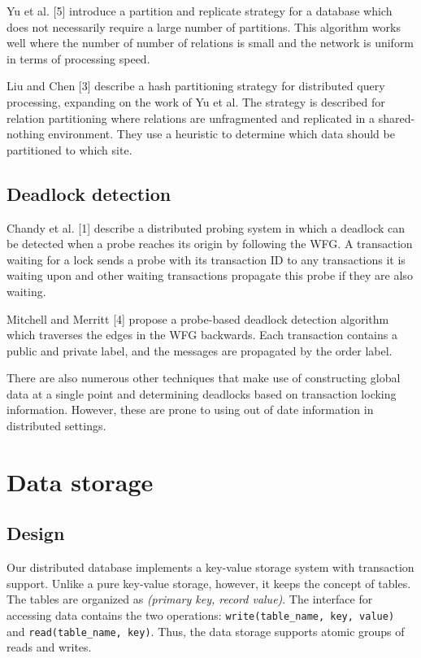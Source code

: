 \documentclass[a4paper, 10pt, notitlepage]{article}
\begin{document}
Yu et al. [5] introduce a partition and replicate strategy for a database which does not necessarily require a large number of partitions. This algorithm works well where the number of number of relations is small and the network is uniform in terms of processing speed.

Liu and Chen [3] describe a hash partitioning strategy for distributed query processing, expanding on the work of Yu et al. The strategy is described for relation partitioning where relations are unfragmented and replicated in a shared-nothing environment. They use a heuristic to determine which data should be partitioned to which site.

\subsection{Deadlock detection}
Chandy et al. [1] describe a distributed probing system in which a deadlock can be detected when a probe reaches its origin by following the WFG. A transaction waiting for a lock sends a probe with its transaction ID to any transactions it is waiting upon and other waiting transactions propagate this probe if they are also waiting.

Mitchell and Merritt [4] propose a probe-based deadlock detection algorithm which traverses the edges in the WFG backwards. Each transaction contains a public and private label, and the messages are propagated by the order label.

There are also numerous other techniques that make use of constructing global data at a single point and determining deadlocks based on transaction locking information. However, these are prone to using out of date information in distributed settings.


\section{Data storage}

\subsection{Design}
Our distributed database implements a key-value storage system with transaction support. Unlike a pure key-value storage, however,
it keeps the concept of tables. The tables are organized as {\em (primary key, record value)}.
The interface for accessing data contains the two operations: \texttt{write(table\_name, key, value)} and \texttt{read(table\_name, key)}.
Thus, the data storage supports atomic groups of reads and writes.
\end{document}

